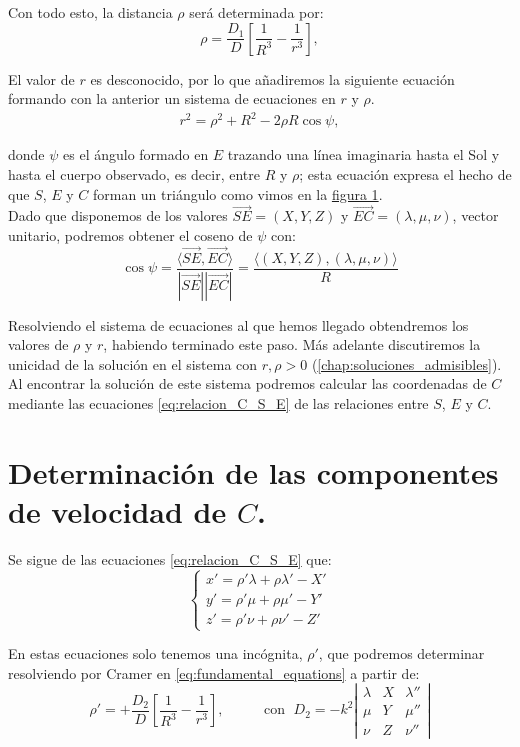 \documentclass[11pt]{book}
\begin{document}
Con todo esto, la distancia $\rho$ será determinada por:
\[
\rho = \frac{D_1}{D}[\frac{1}{R^3}-\frac{1}{r^3}],
\]

El valor de $r$ es desconocido, por lo que añadiremos la siguiente ecuación formando con la anterior un sistema de ecuaciones en $r$ y $\rho$.
\begin{align}
r^2=\rho^2+R^2-2\rho R\cos\psi,
\label{eq:triangle_relations_1}
\end{align}

\noindent donde $\psi$ es el ángulo formado en $E$ trazando una línea imaginaria hasta el Sol y hasta el cuerpo observado, es decir, entre $R$ y $\rho$; esta ecuación expresa el hecho de que $S$, $E$ y $C$ forman un triángulo como vimos en la \hyperref[figure:1]{figura 1}.\\

Dado que disponemos de los valores $\overrightarrow{SE}=(X,Y,Z)$ y $\overrightarrow{EC}=(\lambda,\mu,\nu)$, vector unitario, podremos obtener el coseno de $\psi$ con:
\[
\cos{\psi}=\frac{\langle\overrightarrow{SE},\overrightarrow{EC}\rangle}{|\overrightarrow{SE}||\overrightarrow{EC}|}=\frac{\langle(X,Y,Z),(\lambda,\mu,\nu)\rangle}{R}
\]

Resolviendo el sistema de ecuaciones al que hemos llegado obtendremos los valores de $\rho$ y $r$, habiendo terminado este paso. Más adelante discutiremos la unicidad de la solución en el sistema con $r,\rho>0$ (\ref{chap:soluciones_admisibles}). Al encontrar la solución de este sistema podremos calcular las coordenadas de $C$ mediante las ecuaciones \eqref{eq:relacion_C_S_E} de las relaciones entre $S$, $E$ y $C$.\\

\section{Determinación de las componentes de velocidad de $C$.}
\label{sec:velocity_component}
Se sigue de las ecuaciones \eqref{eq:relacion_C_S_E} que:
\[
\left\{
\begin{array}{l}
	x'=\rho'\lambda+\rho\lambda'-X'\\
	y'=\rho'\mu+\rho\mu'-Y'\\
	z'=\rho'\nu+\rho\nu'-Z'
\end{array}
\right.	
\]

En estas ecuaciones solo tenemos una incógnita, $\rho'$, que podremos determinar resolviendo por Cramer en \eqref{eq:fundamental_equations} a partir de:
\[
\rho'=+\frac{D_2}{D}[\frac{1}{R^3}-\frac{1}{r^3}],
\; \; \; \; \; \; \; \; \; \text{ con } \;
D_2 = -k^2
\left|
\begin{array}{ccc}
\lambda & X & \lambda''\\
\mu & Y & \mu''\\
\nu & Z & \nu''
\end{array}
\right|
\]
\end{document}
